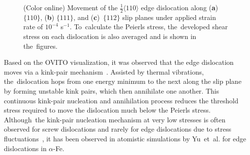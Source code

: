 \documentclass[applsci,article,accept,pdftex,moreauthors]{Definitions/mdpi}
\newcommand{\?}{\stackrel{?}{=}}
\begin{document}
\begin{figure}[H]
\centering
{\captionsetup{position=bottom,justification=centering}
\hfill
{}
\hfill
\centering{}
}

\caption{(Color online) Movement of the $\frac{1}{2} \langle 110 \rangle$ edge dislocation along (\textbf{a}) $\{ 110 \}$, (\textbf{b}) $\{ 111 \}$, and \mbox{(\textbf{c}) $\{112\}$} slip planes under applied strain rate of $10^{-4}$ s$^{-1}$. To~calculate the Peierls stress, the~developed shear stress on each dislocation is also averaged and is shown in the~figures.}
\label{Fig:Disloc}
\end{figure}

Based on the OVITO visualization, it was observed that the edge dislocation moves via a kink-pair mechanism~\cite{Hull2011}. Assisted by thermal vibrations, the~dislocation hops from one energy minimum to the next along the slip plane by forming unstable kink pairs, which then annihilate one another. This continuous kink-pair nucleation and annihilation process reduces the threshold stress required to move the dislocation much below the Peierls stress. Although~the kink-pair nucleation mechanism at very low stresses is often observed for screw dislocations and rarely for edge dislocations due to stress fluctuations~\cite{Gilbert2011, Starikov2020}, it has been observed in atomistic simulations by Yu~et~al. \cite{Yu2009b} for edge dislocations in $\alpha$-Fe.
\end{document}
